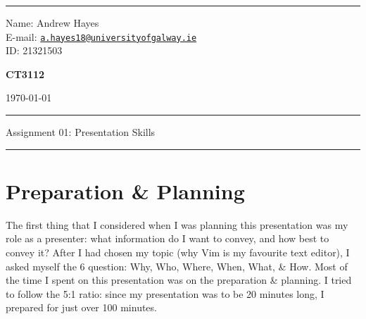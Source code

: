 \documentclass[a4paper]{article}
\begin{document}
\hrule \medskip
\begin{minipage}{0.295\textwidth} 
    \raggedright
    \footnotesize 
    Name: Andrew Hayes \\
    E-mail: \href{mailto://a.hayes18@universityofgalway.ie}{\texttt{a.hayes18@universityofgalway.ie}}  \hfill\\   
    ID: 21321503 \hfill
\end{minipage}
\begin{minipage}{0.4\textwidth} 
    \centering 
    \vspace{0.4em}
    \Large 
    \textbf{CT3112} \\ 
\end{minipage}
\begin{minipage}{0.295\textwidth} 
    \raggedleft
    \today
\end{minipage}
\medskip\hrule 
\begin{center}
    \normalsize
    Assignment 01: Presentation Skills
\end{center}
\hrule

\section{Preparation \& Planning}
The first thing that I considered when I was planning this presentation was my role as a presenter: what information do
I want to convey, and how best to convey it? 
After I had chosen my topic (why Vim is my favourite text editor), I asked myself the 6 question: Why, Who, Where, When,
What, \& How.
Most of the time I spent on this presentation was on the preparation \& planning.
I tried to follow the 5:1 ratio: since my presentation was to be 20 minutes long, I prepared for just over 100 minutes.
\end{document}
